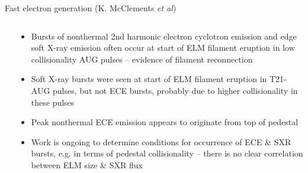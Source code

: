 \documentclass[10pt, compress]{beamer}
\newcommand\Fontvi{\fontsize{8}{7.2}\selectfont}
\begin{document}
\begin{frame}{Fast electron generation (K. McClements \textit{et al})}
\Fontvi
  \begin{columns}
    \begin{column}{0.5\textwidth}
    \end{column}
    \begin{column}{0.5\textwidth}
\begin{itemize}
      \item Bursts of nonthermal 2nd harmonic electron cyclotron emission and edge soft X-ray emission often occur at start of ELM filament eruption in low collisionality AUG pulses – evidence of filament reconnection
\item Soft X-ray bursts were seen at start of ELM filament eruption in T21-AUG pulses, but not ECE bursts, probably due to higher collisionality in these pulses
\item Peak nonthermal ECE emission appears to originate from top of pedestal
\item Work is ongoing to determine conditions for occurrence of ECE \& SXR bursts, e.g. in terms of pedestal collisionality – there is no clear correlation between ELM size \& SXR flux
\end{itemize}
\end{column}

  \end{columns}
\end{frame}
\end{document}
